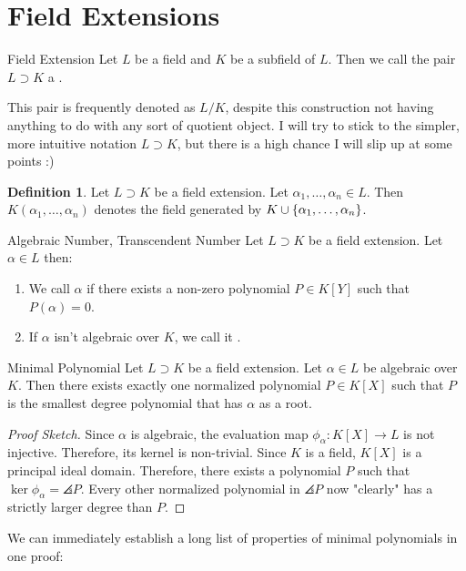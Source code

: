 \documentclass[10pt]{report}
\theoremstyle{definition}
\newtheorem{definition}[lemma]{Definition}
\newenvironment{proofsketch}{\begin{proof}[Beweisskizze]\renewcommand*{\qedsymbol}{\("\square"\)}}{\end{proof}}
\renewenvironment{proofsketch}{\begin{proof}[Proof Sketch]\renewcommand*{\qedsymbol}{\("\square"\)}}{\end{proof}}
\begin{document}
	\section{Field Extensions}
	\begin{importantdefinition}{Field Extension}{}
		Let $L$ be a field and $K$ be a subfield of $L$. Then we call the pair $L \supset K$ a . 
	\end{importantdefinition}
	This pair is frequently denoted as $L/K$, despite this construction not having anything to do with any sort of quotient object. I will try to stick to the simpler, more intuitive notation $L \supset K$, but there is a high chance I will slip up at some points :)
	\begin{definition}
		Let $L \supset K$ be a field extension. Let $\alpha_1, \hdots, \alpha_n \in L$. Then $K(\alpha_1, \hdots, \alpha_n)$ denotes the field generated by $K \cup \qty{\alpha_1, \hdots, \alpha_n}$.
	\end{definition}
	\begin{importantdefinition}{Algebraic Number, Transcendent Number}{}
		Let $L \supset K$ be a field extension. Let $\alpha \in L$ then:
		\begin{enumerate}
			\item We call $\alpha$  if there exists a non-zero polynomial $P \in K[Y]$ such that $P(\alpha) = 0$.
			\item If $\alpha$ isn't algebraic over $K$, we call it .
		\end{enumerate}
	\end{importantdefinition}
	\begin{importanttheorem}{Minimal Polynomial}{}
		Let $L \supset K$ be a field extension. Let $\alpha \in L$ be algebraic over $K$. Then there exists exactly one normalized polynomial $P \in K[X]$ such that $P$ is the smallest degree polynomial that has $\alpha$ as a root.
	\end{importanttheorem}
	\begin{proofsketch}
		Since $\alpha$ is algebraic, the evaluation map $\phi_\alpha : K[X] \to L$ is not injective. Therefore, its kernel is non-trivial.
		Since $K$ is a field, $K[X]$ is a principal ideal domain. Therefore, there exists a polynomial $P$ such that $\ker \phi_\alpha = \angles{P}$. Every other normalized polynomial in $\angles{P}$ now "clearly" has a strictly larger degree than $P$.
	\end{proofsketch}
	We can immediately establish a long list of properties of minimal polynomials in one proof:
\end{document}
